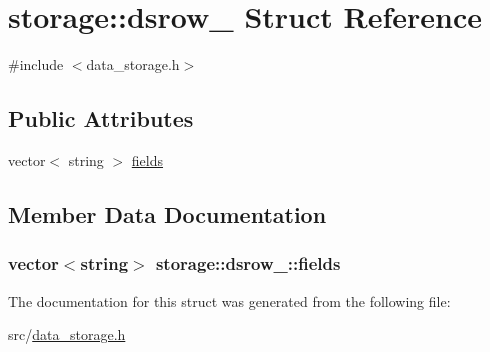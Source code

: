 \hypertarget{structstorage_1_1dsrow__}{
\section{storage::dsrow\_\- Struct Reference}
\label{de/d6b/structstorage_1_1dsrow__}
}


{\ttfamily \#include $<$data\_\-storage.h$>$}

\subsection*{Public Attributes}
\begin{DoxyCompactItemize}
\item 
vector$<$ string $>$ \hyperlink{structstorage_1_1dsrow___afd086e21b6eb76e655f91e8887ce6aff}{fields}
\end{DoxyCompactItemize}


\subsection{Member Data Documentation}
\hypertarget{structstorage_1_1dsrow___afd086e21b6eb76e655f91e8887ce6aff}{
\subsubsection[{fields}]{\setlength{\rightskip}{0pt plus 5cm}vector$<$string$>$ {\bf storage::dsrow\_\-::fields}}}
\label{de/d6b/structstorage_1_1dsrow___afd086e21b6eb76e655f91e8887ce6aff}


The documentation for this struct was generated from the following file:\begin{DoxyCompactItemize}
\item 
src/\hyperlink{data__storage_8h}{data\_\-storage.h}\end{DoxyCompactItemize}
